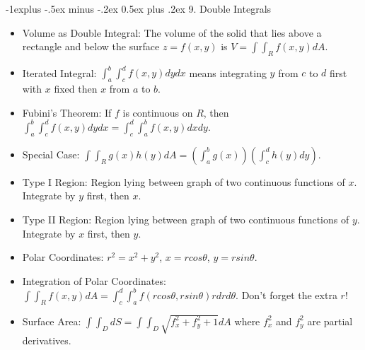 \documentclass[10pt, portrait]{article}
\makeatletter
\renewcommand{\section}{\@startsection{section}{1}{0mm}%
                                {-1ex plus -.5ex minus -.2ex}%
                                {0.5ex plus .2ex}%
                                {\normalfont\large\bfseries}}
\renewcommand{\section}{\@startsection{section}{2}{0mm}%
                                {-1explus -.5ex minus -.2ex}%
                                {0.5ex plus .2ex}%
                                {\normalfont\normalsize\bfseries}}
\makeatother
\begin{document}
\begin{multicols*}{2}
\section{9. Double Integrals}
\begin{itemize}
    \item Volume as Double Integral: The volume of the solid that lies above a rectangle and below the surface $z=f(x,y)$ is $V=\int\int_R f(x,y)dA$.
    \item Iterated Integral: $\int_a^b\int_c^df(x,y)dydx$ means integrating $y$ from $c$ to $d$ first with $x$ fixed then $x$ from $a$ to $b$.
    \item Fubini's Theorem: If $f$ is continuous on $R$, then $\int_a^b\int_c^df(x,y)dydx=\int_c^d\int_a^bf(x,y)dxdy$.
    \item Special Case: $\int\int_Rg(x)h(y)dA=(\int_a^bg(x))(\int_c^dh(y)dy)$.
    \item Type I Region: Region lying between graph of two continuous functions of $x$. Integrate by $y$ first, then $x$.
    \item Type II Region: Region lying between graph of two continuous functions of $y$. Integrate by $x$ first, then $y$.
    \item Polar Coordinates: $r^2=x^2+y^2$, $x=rcos\theta$, $y=rsin\theta$.
    \item Integration of Polar Coordinates: $\int\int_Rf(x,y)dA=\int_c^d\int_a^bf(rcos\theta,rsin\theta)rdrd\theta$. Don't forget the extra $r$!
    \item Surface Area: $\int\int_D dS=\int\int_D\sqrt{f_x^2+f_y^2+1}dA$ where $f_x^2$ and $f_y^2$ are partial derivatives.
\end{itemize}


\end{multicols*}
\end{document}
